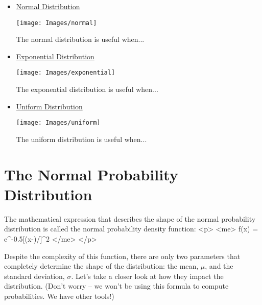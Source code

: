 \documentclass[12pt, letterpaper]{article}
\theoremstyle{definition}
\begin{document}
\begin{itemize}

\item \underline{Normal Distribution}
\begin{multicols}{2}
\begin{center}
\texttt{[image: Images/normal]}
\end{center}

The normal distribution is useful when...
\vspace*{.3in}
\end{multicols}


\item \underline{Exponential Distribution}
\begin{multicols}{2}
\begin{center}
\texttt{[image: Images/exponential]}
\end{center}

The exponential distribution is useful when...
\vspace*{.3in}
\end{multicols}

\item \underline{Uniform Distribution}
\begin{multicols}{2}
\begin{center}
\texttt{[image: Images/uniform]}
\end{center}

The uniform distribution is useful when...
\vspace*{.3in}
\end{multicols}

\end{itemize}


\newpage


\section*{The Normal Probability Distribution}

\begin{statement}
The mathematical expression that describes the shape of the normal probability distribution is called the normal probability density function:
<p>
	<me> f(x) = e^{-0.5[(x-\mu)/\sigma]^2} </me>
</p>

Despite the complexity of this function, there are only two parameters that completely determine the shape of the distribution:  the mean, $\mu$, and the standard deviation, $\sigma$.  Let's take a closer look at how they impact the distribution.  (Don't worry -- we won't be using this formula to compute probabilities.  We have other tools!)
\end{statement}
\end{document}
